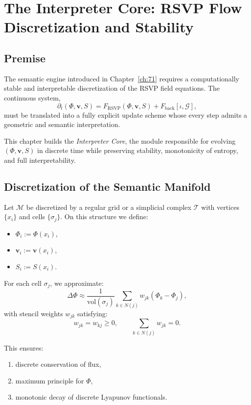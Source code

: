 \chapter{The Interpreter Core: RSVP Flow Discretization and Stability}
\label{ch:72}

\section{Premise}

The semantic engine introduced in Chapter~\ref{ch:71} requires a
computationally stable and interpretable discretization of the
RSVP field equations.  
The continuous system,
\[
  \partial_t (\Phi,\mathbf{v},S)
    = F_{\mathrm{RSVP}}(\Phi,\mathbf{v},S)
    + F_{\mathrm{back}}[\iota,\mathcal{G}],
\]
must be translated into a fully explicit update scheme whose
every step admits a geometric and semantic interpretation.

This chapter builds the \emph{Interpreter Core},
the module responsible for evolving $(\Phi,\mathbf{v},S)$
in discrete time while preserving stability, monotonicity of entropy,
and full interpretability.

\section{Discretization of the Semantic Manifold}

Let $\mathcal{M}$ be discretized by a regular grid or a simplicial complex
$\mathcal{T}$ with vertices $\{x_i\}$ and cells $\{\sigma_j\}$.
On this structure we define:
\begin{itemize}
\item $\Phi_i := \Phi(x_i)$,
\item $\mathbf{v}_i := \mathbf{v}(x_i)$,
\item $S_i := S(x_i)$.
\end{itemize}

For each cell $\sigma_j$, we approximate:
\[
  \Delta \Phi \approx \frac{1}{\mathrm{vol}(\sigma_j)}
     \sum_{k \in N(j)} w_{jk} (\Phi_k - \Phi_j),
\]
with stencil weights $w_{jk}$ satisfying:
\[
   w_{jk} = w_{kj} \ge 0,
   \qquad
   \sum_{k \in N(j)} w_{jk} = 0.
\]

This ensures:
\begin{enumerate}
\item discrete conservation of flux,
\item maximum principle for $\Phi$,
\item monotonic decay of discrete Lyapunov functionals.
\end{enumerate}

